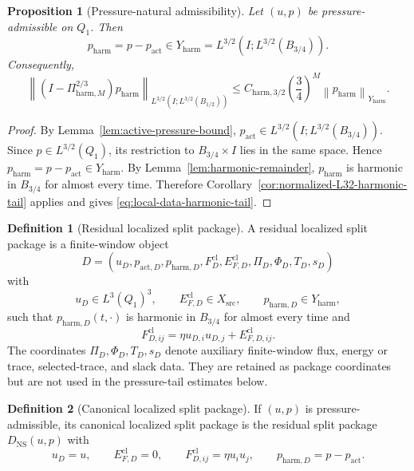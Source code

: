 \documentclass[11pt]{article}
\numberwithin{equation}{section}
\newtheorem{proposition}[proposition]{Proposition}
\theoremstyle{definition}
\newtheorem{definition}[definition]{Definition}
\theoremstyle{remark}
\newcommand{\NS}{\mathrm{NS}}
\newcommand{\harm}{\mathrm{harm}}
\newcommand{\src}{\mathrm{src}}
\newcommand{\act}{\mathrm{act}}
\newcommand{\cl}{\mathrm{cl}}
\newcommand{\norm}[2]{\left\|#1\right\|_{#2}}
\begin{document}
\begin{proposition}[Pressure-natural admissibility]\label{prop:pressure-natural-admissibility}
Let $(u,p)$ be pressure-admissible on $Q_1$.  Then
\[
        p_{\harm}=p-p_{\act}\in Y_{\harm}=L^{3/2}(I;L^{3/2}(B_{3/4})).
\]
Consequently,
\begin{equation}\label{eq:local-data-harmonic-tail}
\norm{(I-\Pi^{2/3}_{\harm,M})p_{\harm}}{L^{3/2}(I;L^{3/2}(B_{1/2}))}
\le
C_{\harm,3/2}\left(\frac34\right)^M
\norm{p_{\harm}}{Y_{\harm}}.
\end{equation}
\end{proposition}

\begin{proof}
By Lemma~\ref{lem:active-pressure-bound}, $p_{\act}\in L^{3/2}(I;L^{3/2}(B_{3/4}))$.  Since
$p\in L^{3/2}(Q_1)$, its restriction to $B_{3/4}\times I$ lies in the same space.  Hence
$p_{\harm}=p-p_{\act}\in Y_{\harm}$.  By Lemma~\ref{lem:harmonic-remainder}, $p_{\harm}$ is
harmonic in $B_{3/4}$ for almost every time.  Therefore Corollary~\ref{cor:normalized-L32-harmonic-tail}
applies and gives \eqref{eq:local-data-harmonic-tail}.
\end{proof}

\begin{definition}[Residual localized split package]\label{def:residual-split-package}
A residual localized split package is a finite-window object
\[
        D=(u_D,p_{\act,D},p_{\harm,D},F^{\cl}_D,E^{\cl}_{F,D},\Pi_D,\Phi_D,T_D,s_D)
\]
with
\[
        u_D\in L^3(Q_1)^3,
        \qquad
        E^{\cl}_{F,D}\in X_{\src},
        \qquad
        p_{\harm,D}\in Y_{\harm},
\]
such that $p_{\harm,D}(t,\cdot)$ is harmonic in $B_{3/4}$ for almost every time and
\begin{equation}\label{eq:clean-source-split}
        F^{\cl}_{D,ij}=\eta u_{D,i}u_{D,j}+E^{\cl}_{F,D,ij}.
\end{equation}
The coordinates $\Pi_D,\Phi_D,T_D,s_D$ denote auxiliary finite-window flux, energy or
trace, selected-trace, and slack data.  They are retained as package coordinates but are not
used in the pressure-tail estimates below.
\end{definition}

\begin{definition}[Canonical localized split package]\label{def:canonical-split-package}
If $(u,p)$ is pressure-admissible, its canonical localized split package is the residual
split package $D_{\NS}(u,p)$ with
\[
        u_D=u,
        \qquad
        E^{\cl}_{F,D}=0,
        \qquad
        F^{\cl}_{D,ij}=\eta u_i u_j,
        \qquad
        p_{\harm,D}=p-p_{\act}.
\]
\end{definition}
\end{document}
